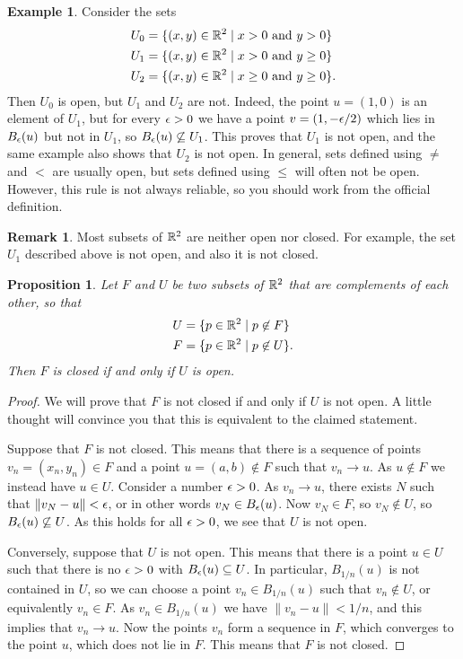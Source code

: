 \documentclass[reqno]{amsart}
\newtheorem{proposition}[theorem]{Proposition}
\theoremstyle{definition}
\newtheorem{remark}[theorem]{Remark}
\newtheorem{example}[theorem]{Example}
\begin{document}
\begin{example}
 Consider the sets 
 \begin{align*}
  U_0 &= \{(x,y)\in{\mathbb{R}}^2\;|\; x>0 \text{ and } y>0\} \\
  U_1 &= \{(x,y)\in{\mathbb{R}}^2\;|\; x>0 \text{ and } y\geq 0\} \\
  U_2 &= \{(x,y)\in{\mathbb{R}}^2\;|\; x\geq 0 \text{ and } y\geq 0\}.
 \end{align*}
 Then $U_0$ is open, but $U_1$ and $U_2$ are not.  Indeed, the point
 $u=(1,0)$ is an element of $U_1$, but for every $\epsilon>0$ we have a
 point $v=(1,-\epsilon/2)$ which lies in $B_\epsilon(u)$ but not in $U_1$, so
 $B_\epsilon(u)\not\subseteq U_1$.  This proves that $U_1$ is not open, and the
 same example also shows that $U_2$ is not open.  In general, sets
 defined using $\neq$ and $<$ are usually open, but sets defined using
 $\leq$ will often not be open.  However, this rule is not always
 reliable, so you should work from the official definition.
\end{example}

\begin{remark}
 Most subsets of ${\mathbb{R}}^2$ are neither open nor closed.  For example, the
 set $U_1$ described above is not open, and also it is not closed.
\end{remark}

\begin{proposition}
 Let $F$ and $U$ be two subsets of ${\mathbb{R}}^2$ that are complements of each
 other, so that 
 \begin{align*}
  U &= \{p\in{\mathbb{R}}^2\;|\; p\not\in F\} \\
  F &= \{p\in{\mathbb{R}}^2\;|\; p\not\in U\}.
 \end{align*}
 Then $F$ is closed if and only if $U$ is open.
\end{proposition}
\begin{proof}
 We will prove that $F$ is not closed if and only if $U$ is not open.
 A little thought will convince you that this is equivalent to the
 claimed statement.

 Suppose that $F$ is not closed.  This means that there is a sequence
 of points $v_n=(x_n,y_n)\in F$ and a point $u=(a,b)\not\in F$ such
 that $v_n\to u$.  As $u\not\in F$ we instead have $u\in U$.  Consider
 a number $\epsilon>0$.  As $v_n\to u$, there exists $N$ such that
 $\|v_N-u\|<\epsilon$, or in other words $v_N\in B_\epsilon(u)$.  Now
 $v_N\in F$, so $v_N\not\in U$, so $B_\epsilon(u)\not\subseteq U$.  As this
 holds for all $\epsilon>0$, we see that $U$ is not open.

 Conversely, suppose that $U$ is not open.  This means that there is a
 point $u\in U$ such that there is no $\epsilon>0$ with $B_\epsilon(u)\subseteq U$.
 In particular, $B_{1/n}(u)$ is not contained in $U$, so we can choose
 a point $v_n\in B_{1/n}(u)$ such that $v_n\not\in U$, or equivalently
 $v_n\in F$.  As $v_n\in B_{1/n}(u)$ we have $\|v_n-u\|<1/n$, and this
 implies that $v_n\to u$.  Now the points $v_n$ form a sequence in
 $F$, which converges to the point $u$, which does not lie in $F$.
 This means that $F$ is not closed.
\end{proof}
\end{document}
